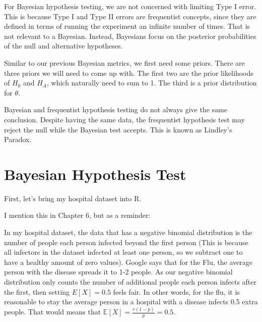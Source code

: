 \documentclass[
  letterpaper,
  DIV=11,
  numbers=noendperiod]{scrreprt}
\newenvironment{Shaded}{\begin{snugshade}}{\end{snugshade}}
\newcommand{\NormalTok}[1]{\textcolor[rgb]{0.00,0.23,0.31}{#1}}
\begin{document}
For Bayesian hypothesis testing, we are not concerned with limiting Type
I error. This is because Type I and Type II errors are frequentist
concepts, since they are defined in terms of running the experiment an
infinite number of times. That is not relevant to a Bayesian. Instead,
Bayesians focus on the posterior probabilities of the null and
alternative hypotheses.

Similar to our previous Bayesian metrics, we first need some priors.
There are three priors we will need to come up with. The first two are
the prior likelihoods of \(H_0\) and \(H_A\), which naturally need to
sum to 1. The third is a prior distribution for \(\theta\).

Bayesian and frequentist hypothesis testing do not always give the same
conclusion. Despite having the same data, the frequentist hypothesis
test may reject the null while the Bayesian test accepts. This is known
as Lindley's Paradox.

\section{Bayesian Hypothesis Test}\label{bayesian-hypothesis-test}

First, let's bring my hospital dataset into R.

\begin{Shaded}
\end{Shaded}

I mention this in Chapter 6, but as a reminder:

In my hospital dataset, the data that has a negative binomial
distribution is the number of people each person infected beyond the
first person (This is because all infectors in the dataset infected at
least one person, so we subtract one to have a healthy amount of zero
values). Google says that for the Flu, the average person with the
disease spreads it to 1-2 people. As our negative binomial distribution
only counts the number of additional people each person infects after
the first, then setting \(E[X] = 0.5\) feels fair. In other words, for
the flu, it is reasonable to stay the average person in a hospital with
a disease infects 0.5 extra people. That would means that
\(\mathbb{E}[X] = \frac{r(1-p)}{p} = 0.5\).
\end{document}
